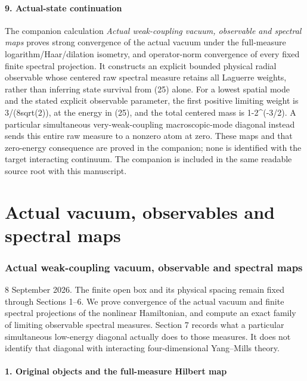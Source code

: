 \documentclass[
  11pt,
]{article}
\begin{document}
\subsection{9. Actual-state
continuation}\label{weak-coupling-part-1-actual-state-continuation}

The companion calculation \emph{Actual weak-coupling vacuum, observable
and spectral maps} proves strong convergence of the actual vacuum under
the full-measure logarithm/Haar/dilation isometry, and operator-norm
convergence of every fixed finite spectral projection. It constructs an
explicit bounded physical radial observable whose centered raw spectral
measure retains all Laguerre weights, rather than inferring state
survival from (25) alone. For a lowest spatial mode and the stated
explicit observable parameter, the first positive limiting weight is
3/(8sqrt(2)), at the energy in (25), and the total centered mass is
1-2\^{}(-3/2). A particular simultaneous very-weak-coupling
macroscopic-mode diagonal instead sends this entire raw measure to a
nonzero atom at zero. These maps and that zero-energy consequence are
proved in the companion; none is identified with the target interacting
continuum. The companion is included in the same readable source root
with this manuscript.

\clearpage
\part{Actual vacuum, observables and spectral maps}
\section{Actual weak-coupling vacuum, observable and spectral
maps}\label{weak-coupling-part-2-actual-weak-coupling-vacuum-observable-and-spectral-maps}

8 September 2026. The finite open box and its physical spacing remain
fixed through Sections 1--6. We prove convergence of the actual vacuum
and finite spectral projections of the nonlinear Hamiltonian, and
compute an exact family of limiting observable spectral measures.
Section 7 records what a particular simultaneous low-energy diagonal
actually does to those measures. It does not identify that diagonal with
interacting four-dimensional Yang--Mills theory.

\subsection{1. Original objects and the full-measure Hilbert
map}\label{weak-coupling-part-2-original-objects-and-the-full-measure-hilbert-map}
\end{document}
